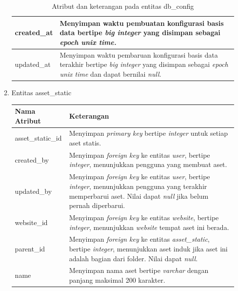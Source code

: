 \begin{enumerate}[label*=\arabic*.,ref=\arabic*]
\begin{enumerate}[label=\arabic*.]
\begin{table}[H]
\begin{tabular}{|p{3.25cm}|p{8cm}|}
                created\_at                        & Menyimpan waktu pembuatan konfigurasi basis data bertipe \textit{big integer} yang disimpan sebagai \textit{epoch unix time.} \\ \hline
                updated\_at                        & Menyimpan waktu pembaruan konfigurasi basis data terakhir bertipe \textit{big integer} yang disimpan sebagai \textit{epoch unix time} dan dapat bernilai \textit{null}. \\ \hline
            \end{tabular}
            \caption{Atribut dan keterangan pada entitas db\_config}
            \label{tab:db_config_entity}
        \end{table}

        \item Entitas asset\_static
        \vspace{-0.5em}
        \begin{table}[H]
            \centering
            \begin{tabular}{|p{3.25cm}|p{8cm}|}
                \hline
                \rowcolor[HTML]{DAE8FC} 
                {\color[HTML]{000000} Nama Atribut} & {\color[HTML]{000000} Keterangan}           \\ \hline
                asset\_static\_id                  & Menyimpan \textit{primary key} bertipe \textit{integer} untuk setiap aset statis. \\ \hline
                created\_by                        & Menyimpan \textit{foreign key} ke entitas \textit{user}, bertipe \textit{integer}, menunjukkan pengguna yang membuat aset. \\ \hline
                updated\_by                        & Menyimpan \textit{foreign key} ke entitas \textit{user}, bertipe \textit{integer}, menunjukkan pengguna yang terakhir memperbarui aset. Nilai dapat \textit{null} jika belum pernah diperbarui. \\ \hline
                website\_id                        & Menyimpan \textit{foreign key} ke entitas \textit{website}, bertipe \textit{integer}, menunjukkan \textit{website} tempat aset ini berada. \\ \hline
                parent\_id                         & Menyimpan \textit{foreign key} ke entitas \textit{asset\_static}, bertipe \textit{integer}, menunjukkan aset induk jika aset ini adalah bagian dari folder. Nilai dapat \textit{null}. \\ \hline
                name                               & Menyimpan nama aset bertipe \textit{varchar} dengan panjang maksimal 200 karakter. \\ \hline

\end{tabular}
\end{table}
\end{enumerate}
\end{enumerate}
